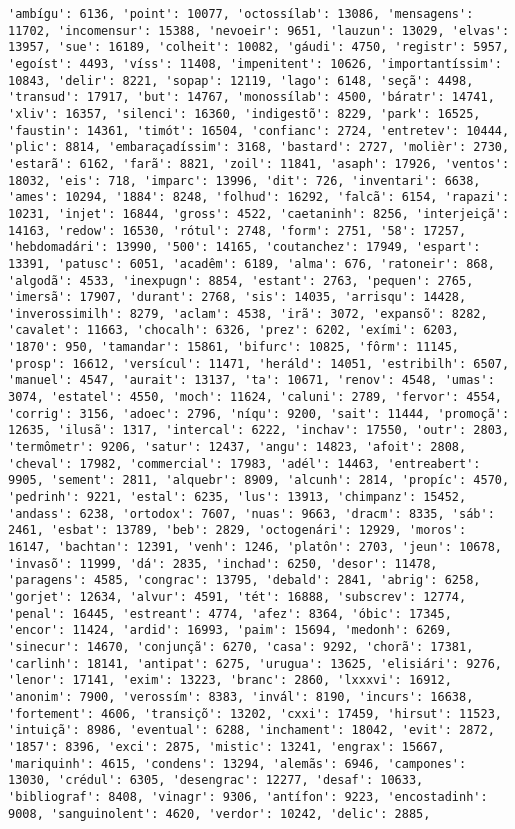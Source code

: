 \documentclass[11pt]{article}
\begin{document}
\begin{Verbatim}[commandchars=\\\{\}]
'ambígu': 6136, 'point': 10077, 'octossílab': 13086, 'mensagens': 11702, 'incomensur': 15388, 'nevoeir': 9651, 'lauzun': 13029, 'elvas': 13957, 'sue': 16189, 'colheit': 10082, 'gáudi': 4750, 'registr': 5957, 'egoíst': 4493, 'víss': 11408, 'impenitent': 10626, 'importantíssim': 10843, 'delir': 8221, 'sopap': 12119, 'lago': 6148, 'seçã': 4498, 'transud': 17917, 'but': 14767, 'monossílab': 4500, 'báratr': 14741, 'xliv': 16357, 'silenci': 16360, 'indigestõ': 8229, 'park': 16525, 'faustin': 14361, 'timót': 16504, 'confianc': 2724, 'entretev': 10444, 'plic': 8814, 'embaraçadíssim': 3168, 'bastard': 2727, 'molièr': 2730, 'estarã': 6162, 'farã': 8821, 'zoil': 11841, 'asaph': 17926, 'ventos': 18032, 'eis': 718, 'imparc': 13996, 'dit': 726, 'inventari': 6638, 'ames': 10294, '1884': 8248, 'folhud': 16292, 'falcã': 6154, 'rapazi': 10231, 'injet': 16844, 'gross': 4522, 'caetaninh': 8256, 'interjeiçã': 14163, 'redow': 16530, 'rótul': 2748, 'form': 2751, '58': 17257, 'hebdomadári': 13990, '500': 14165, 'coutanchez': 17949, 'espart': 13391, 'patusc': 6051, 'acadêm': 6189, 'alma': 676, 'ratoneir': 868, 'algodã': 4533, 'inexpugn': 8854, 'estant': 2763, 'pequen': 2765, 'imersã': 17907, 'durant': 2768, 'sis': 14035, 'arrisqu': 14428, 'inverossimilh': 8279, 'aclam': 4538, 'irã': 3072, 'expansõ': 8282, 'cavalet': 11663, 'chocalh': 6326, 'prez': 6202, 'exími': 6203, '1870': 950, 'tamandar': 15861, 'bifurc': 10825, 'fôrm': 11145, 'prosp': 16612, 'versícul': 11471, 'heráld': 14051, 'estribilh': 6507, 'manuel': 4547, 'aurait': 13137, 'ta': 10671, 'renov': 4548, 'umas': 3074, 'estatel': 4550, 'moch': 11624, 'caluni': 2789, 'fervor': 4554, 'corrig': 3156, 'adoec': 2796, 'níqu': 9200, 'sait': 11444, 'promoçã': 12635, 'ilusã': 1317, 'intercal': 6222, 'inchav': 17550, 'outr': 2803, 'termômetr': 9206, 'satur': 12437, 'angu': 14823, 'afoit': 2808, 'cheval': 17982, 'commercial': 17983, 'adél': 14463, 'entreabert': 9905, 'sement': 2811, 'alquebr': 8909, 'alcunh': 2814, 'propíc': 4570, 'pedrinh': 9221, 'estal': 6235, 'lus': 13913, 'chimpanz': 15452, 'andass': 6238, 'ortodox': 7607, 'nuas': 9663, 'dracm': 8335, 'sáb': 2461, 'esbat': 13789, 'beb': 2829, 'octogenári': 12929, 'moros': 16147, 'bachtan': 12391, 'venh': 1246, 'platôn': 2703, 'jeun': 10678, 'invasõ': 11999, 'dá': 2835, 'inchad': 6250, 'desor': 11478, 'paragens': 4585, 'congrac': 13795, 'debald': 2841, 'abrig': 6258, 'gorjet': 12634, 'alvur': 4591, 'tét': 16888, 'subscrev': 12774, 'penal': 16445, 'estreant': 4774, 'afez': 8364, 'óbic': 17345, 'encor': 11424, 'ardid': 16993, 'paim': 15694, 'medonh': 6269, 'sinecur': 14670, 'conjunçã': 6270, 'casa': 9292, 'chorã': 17381, 'carlinh': 18141, 'antipat': 6275, 'urugua': 13625, 'elisiári': 9276, 'lenor': 17141, 'exim': 13223, 'branc': 2860, 'lxxxvi': 16912, 'anonim': 7900, 'verossím': 8383, 'invál': 8190, 'incurs': 16638, 'fortement': 4606, 'transiçõ': 13202, 'cxxi': 17459, 'hirsut': 11523, 'intuiçã': 8986, 'eventual': 6288, 'inchament': 18042, 'evit': 2872, '1857': 8396, 'exci': 2875, 'mistic': 13241, 'engrax': 15667, 'mariquinh': 4615, 'condens': 13294, 'alemãs': 6946, 'campones': 13030, 'crédul': 6305, 'desengrac': 12277, 'desaf': 10633, 'bibliograf': 8408, 'vinagr': 9306, 'antífon': 9223, 'encostadinh': 9008, 'sanguinolent': 4620, 'verdor': 10242, 'delic': 2885, 
\end{Verbatim}
\end{document}
